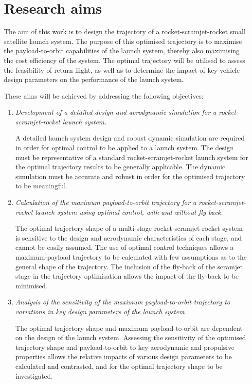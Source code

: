   	   

  	  	
  	  	

  \section{Research aims}

    The aim of this work is to design the trajectory of a rocket-scramjet-rocket small satellite launch system. The purpose of this optimised trajectory is to maximise the payload-to-orbit capabilities of the launch system, thereby also maximising the cost efficiency of the system. The optimal trajectory will be utilised to assess the feasibility of return flight, as well as to determine the impact of key vehicle design parameters on the performance of the launch system. 
 
    
\vspace*{10pt}
    \noindent These aims will be achieved by addressing the following objectives:
    \begin{enumerate}
    	 \item \emph{Development of a detailed design and aerodynamic simulation for a rocket-scramjet-rocket launch system.}
    	 
    	   A detailed launch system design and robust dynamic simulation are required in order for optimal control to be applied to a launch system. The design must be representative of a standard rocket-scramjet-rocket launch system for the optimal trajectory results to be generally applicable. The dynamic simulation must be accurate and robust in order for the optimised trajectory to be meaningful. \\

\item \emph{Calculation of the maximum payload-to-orbit trajectory for a rocket-scramjet-rocket launch system using optimal control, with and without fly-back.}

The optimal trajectory shape of a multi-stage rocket-scramjet-rocket system is sensitive to the design and aerodynamic characteristics of each stage, and cannot be easily assumed. The use of optimal control techniques allows a maximum-payload trajectory to be calculated with few assumptions as to the general shape of the trajectory. The inclusion of the fly-back of the scramjet stage in the trajectory optimisation allows the impact of the fly-back to be minimised.\\

      \item \emph{Analysis of the sensitivity of the maximum payload-to-orbit trajectory to variations in key design parameters of the launch system} 

	The optimal trajectory shape and maximum payload-to-orbit are dependent on the design of the launch system. 
	Assessing the sensitivity of the optimised trajectory shape and payload-to-orbit to key aerodynamic and propulsive properties allows the relative impacts of various design parameters to be calculated and contrasted, and for the optimal trajectory shape to be investigated. \\

    

    \end{enumerate}

